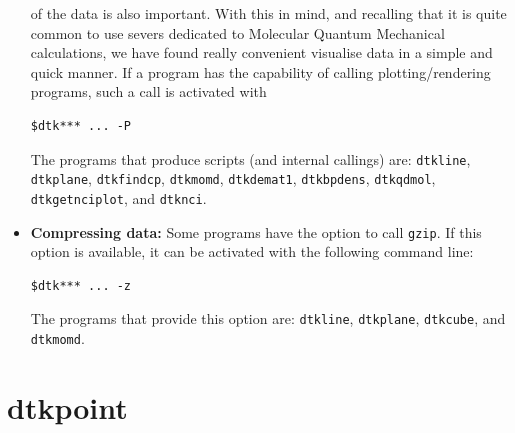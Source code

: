 \begin{itemize}
		of the data is also important. With this in mind, and recalling that it is quite common to use
		severs dedicated to Molecular Quantum Mechanical calculations, we have found really
		convenient visualise data in a simple and quick manner. If a \DTK{} program has
		the capability of calling plotting/rendering programs, such a call is activated with
		\begin{lstlisting}
$dtk*** ... -P
		\end{lstlisting}
	   The programs that produce scripts (and internal callings) are: \texttt{dtkline}, \texttt{dtkplane},
	   \texttt{dtkfindcp}, \texttt{dtkmomd}, \texttt{dtkdemat1}, \texttt{dtkbpdens},
	   \texttt{dtkqdmol}, \texttt{dtkgetnciplot}, and \texttt{dtknci}.
   \item \textbf{Compressing data:} Some programs have the option to call \texttt{gzip}.
   	If this option is available, it can be activated with the following command line:
		\begin{lstlisting}
$dtk*** ... -z
     \end{lstlisting}
     The programs that provide this option are: \texttt{dtkline}, \texttt{dtkplane}, \texttt{dtkcube},
     and \texttt{dtkmomd}.
\end{itemize}

\section{dtkpoint}

